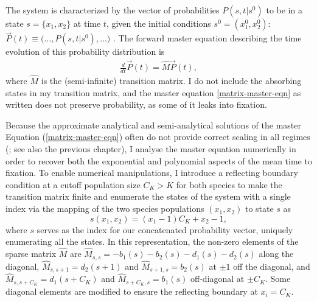 The system is characterized by the vector of probabilities $P(s,t|s^0)$ to be in a state $s=\{x_1,x_2\}$ at time $t$, given the initial conditions $s^0=(x_1^{0},x_2^{0})$: $\vec{P}(t)\equiv\big(\dots,P(s,t|s^0),\dots \big)$ \cite{Munsky2006}. 
The forward master equation describing the time evolution of this probability distribution is \cite{VanKampen1992}
\begin{align} \label{matrix-master-eqn}
\frac{d}{dt}\vec{P}(t) = \hat{M}\vec{P}(t),
\end{align}
where $\hat{M}$ is the (semi-infinite) transition matrix. %
I do not include the absorbing states in my transition matrix, and the master equation \ref{matrix-master-eqn} as written does not preserve probability, as some of it leaks into fixation. 

Because the approximate analytical and semi-analytical solutions of the master Equation (\ref{matrix-master-eqn}) often do not provide correct scaling in all regimes (\cite{Doering2005,Assaf2016,Badali2018}; see also the previous chapter), I analyse the master equation numerically in order to recover both the exponential and polynomial aspects of the mean time to fixation. 
To enable numerical manipulations, I introduce a reflecting boundary condition at a cutoff population size $C_K>K$ for both species to make the transition matrix finite \cite{Munsky2006,Cao2016} and enumerate the states of the system with a single index \cite{Munsky2006} via the mapping of the two species populations $(x_1,x_2)$ to state $s$ as
\begin{equation}
s(x_1,x_2) = (x_1-1)C_K+x_2-1,
\end{equation}
where $s$ serves as the index for our concatenated probability vector, uniquely enumerating all the states. 
In this representation, the non-zero elements of the sparse matrix $\hat{M}$ are $\hat{M}_{s,s}=-b_1(s)-b_2(s)-d_1(s)-d_2(s)$ along the diagonal, $\hat{M}_{s,s+1}=d_2(s+1)$ and $\hat{M}_{s+1,s}=b_2(s)$ at $\pm 1$ off the diagonal, and $\hat{M}_{s,s+C_K}=d_1(s+C_K)$ and $\hat{M}_{s+C_K,s}=b_1(s)$ off-diagonal at $\pm C_K$. 
Some diagonal elements are modified to ensure the reflecting boundary at $x_i=C_K$. 


